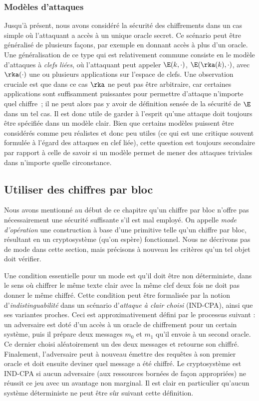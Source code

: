 \subsubsection{Modèles d'attaques}

Jusqu'à présent, nous avons considéré la sécurité des chiffrements dans un cas simple où l'attaquant a accès à un unique oracle secret.
Ce scénario peut être généralisé de plusieurs façons, par exemple en donnant accès à plus d'un oracle. Une généralisation de ce type qui est
relativement commune consiste en le modèle d'attaques à \emph{clefs liées}, où l'attaquant peut appeler
$\E(k,\cdot)$, $\E(\rka(k),\cdot)$, avec $\rka(\cdot)$ une ou plusieurs applications sur l'espace de clefs.
Une observation cruciale est que dans ce cas $\rka$ ne peut pas être arbitraire, car certaines applications sont suffisamment puissantes
pour permettre d'attaque n'importe quel chiffre~; il ne peut alors pas y avoir de définition sensée de la sécurité de $\E$ dans un tel cas.
Il est donc utile de garder à l'esprit qu'une attaque doit toujours être spécifiée dans un modèle clair. Bien que certains modèles puissent
être considérés comme peu réalistes et donc peu utiles (ce qui est une critique souvent formulée à l'égard des attaques en clef liée), cette
question est toujours secondaire par rapport à celle de savoir si un modèle permet de mener des attaques triviales dans n'importe quelle circonstance. 

\subsection{Utiliser des chiffres par bloc}
\label{sec:cf_modes}

Nous avons mentionné au début de ce chapitre qu'un chiffre par bloc n'offre pas nécessairement une sécurité suffisante s'il est mal employé.
On appelle \emph{mode d'opération} une construction à base d'une primitive telle qu'un chiffre par bloc, résultant en un cryptosystème (qu'on espère) fonctionnel.
Nous ne décrivons pas de mode dans cette section, mais précisons à nouveau les critères qu'un tel objet doit vérifier.

Une condition essentielle pour un mode est qu'il doit être non déterministe, dans le sens où chiffrer le même texte clair avec la même clef deux fois ne
doit pas donner le même chiffré. Cette condition peut être formalisée par la notion d'\emph{indistinguabilité} dans un scénario d'\emph{attaque à clair choisi}
(\textsf{IND-CPA}), ainsi que ses variantes proches. Ceci est approximativement défini par le processus suivant : un adversaire est doté d'un accès
à un oracle de chiffrement pour un certain système, puis il prépare deux messages $m_0$ et $m_1$ qu'il envoie à un second oracle. Ce dernier
choisi aléatoirement un des deux messages et retourne son chiffré. Finalement, l'adversaire peut à nouveau émettre des requêtes à son premier oracle et doit ensuite
deviner quel message a été chiffré. Le cryptosystème est \textsf{IND-CPA} si aucun adversaire (aux ressources bornées de façon appropriées) ne réussit ce jeu
avec un avantage non marginal. Il est clair en particulier qu'aucun système déterministe ne peut être sûr suivant cette définition. 


